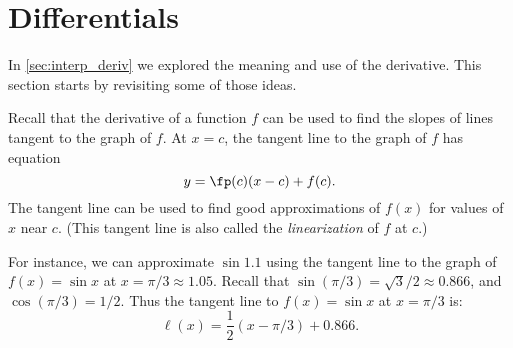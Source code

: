 \section{Differentials}\label{sec:differentials}

In \autoref{sec:interp_deriv} we explored the meaning and use of the derivative. This section starts by revisiting some of those ideas.

Recall that the derivative of a function $f$ can be used to find the slopes of lines tangent to the graph of $f$. At $x=c$, the tangent line to the graph of $f$ has equation
\[y = \fp(c)(x-c)+f(c).\]
The tangent line can be used to find good approximations of $f(x)$ for values of $x$ near $c$. (This tangent line is also called the \emph{linearization} of $f$ at $c$.)

For instance, we can approximate $\sin 1.1$ using the tangent line to the graph of $f(x)=\sin x$ at $x=\pi/3 \approx 1.05.$ Recall that $\sin (\pi/3) = \sqrt{3}/2 \approx 0.866$, and $\cos (\pi/3) = 1/2$. Thus the tangent line to $f(x) = \sin x$ at $x=\pi/3$ is:
\[\ell(x) = \frac12(x-\pi/3)+0.866.\]



